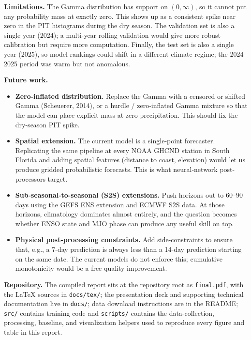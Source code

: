 \documentclass[11pt]{article}
\begin{document}
\textbf{Limitations.} The Gamma distribution has support on $(0, \infty)$, so it cannot put any probability mass at exactly zero. This shows up as a consistent spike near zero in the PIT histograms during the dry season. The validation set is also a single year (2024); a multi-year rolling validation would give more robust calibration but require more computation. Finally, the test set is also a single year (2025), so model rankings could shift in a different climate regime; the 2024--2025 period was warm but not anomalous.

\textbf{Future work.}
\begin{itemize}[leftmargin=1.5em]
    \item \textbf{Zero-inflated distribution.} Replace the Gamma with a censored or shifted Gamma (Scheuerer, 2014), or a hurdle / zero-inflated Gamma mixture so that the model can place explicit mass at zero precipitation. This should fix the dry-season PIT spike.
    \item \textbf{Spatial extension.} The current model is a single-point forecaster. Replicating the same pipeline at every NOAA GHCND station in South Florida and adding spatial features (distance to coast, elevation) would let us produce gridded probabilistic forecasts. This is what neural-network post-processors target.
    \item \textbf{Sub-seasonal-to-seasonal (S2S) extensions.} Push horizons out to 60--90 days using the GEFS ENS extension and ECMWF S2S data. At those horizons, climatology dominates almost entirely, and the question becomes whether ENSO state and MJO phase can produce any useful skill on top.
    \item \textbf{Physical post-processing constraints.} Add side-constraints to ensure that, e.g., a 7-day prediction is always less than a 14-day prediction starting on the same date. The current models do not enforce this; cumulative monotonicity would be a free quality improvement.
\end{itemize}

\textbf{Repository.} The compiled report sits at the repository root as \texttt{final.pdf}, with the LaTeX sources in \texttt{docs/tex/}; the presentation deck and supporting technical documentation live in \texttt{docs/}; data download instructions are in the README; \texttt{src/} contains training code and \texttt{scripts/} contains the data-collection, processing, baseline, and visualization helpers used to reproduce every figure and table in this report.
\end{document}
